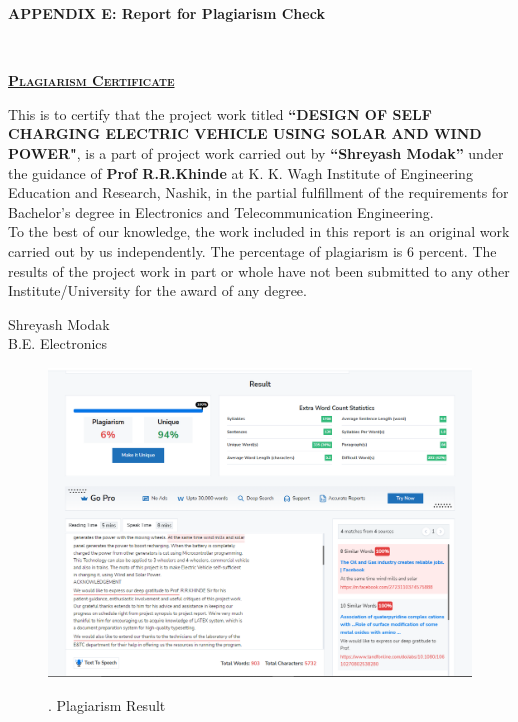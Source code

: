 \documentclass[a4paper,12pt]{article}
\begin{document}
\newpage
\begin{center}
\LARGE\textbf{APPENDIX E: Report for Plagiarism Check}
\\[1cm]
\end{center}
\thispagestyle{empty}
\begin{center}
\textbf{\LARGE\scshape\underline{Plagiarism Certificate}}\\[2cm]
\end{center}
\large This is to certify that the project work titled \textbf{“DESIGN OF SELF CHARGING ELECTRIC VEHICLE USING SOLAR AND WIND POWER"}, is a part of project work carried out by \textbf{“Shreyash Modak”}
under the guidance of\textbf{ Prof R.R.Khinde} at K. K. Wagh Institute of
Engineering Education and Research, Nashik, in the partial fulfillment of the requirements
for Bachelor’s degree in Electronics and Telecommunication Engineering.\\
\large To the best of our knowledge, the work included in this report is an original work
carried out by us independently. The percentage of plagiarism is 6 percent. The results of the
project work in part or whole have not been submitted to any other Institute/University for
the award of any degree.

\vspace{4cm}
\begin{flushright}
Shreyash Modak\\

B.E. Electronics\\
\end{flushright}

\newpage
\begin{figure}[!h]
\centering
\includegraphics[scale=0.5]{pl.png}\\
\caption{. Plagiarism Result}
\end{figure}
\end{document}
